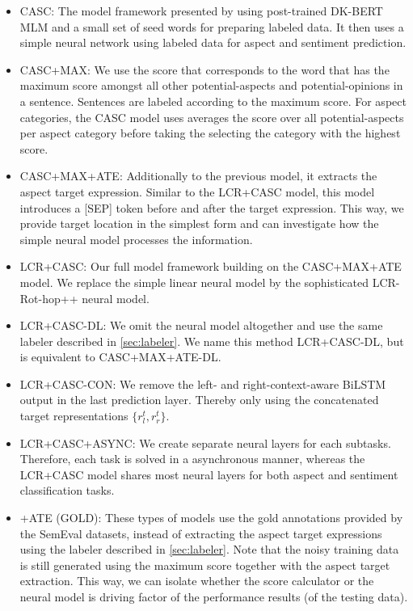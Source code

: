 \documentclass[american, oneside]{ecsgdp}
\begin{document}
\begin{itemize}
    \item CASC: The model framework presented by \textcite{Kumar2021CASC} using post-trained DK-BERT MLM and a small set of seed words for preparing labeled data. It then uses a simple neural network using labeled data for aspect and sentiment prediction.
    \item CASC+MAX: We use the score that corresponds to the word that has the maximum score amongst all other potential-aspects and potential-opinions in a sentence. Sentences are labeled according to the maximum score. For aspect categories, the CASC model uses averages the score over all potential-aspects per aspect category before taking the selecting the category with the highest score. 
    \item CASC+MAX+ATE: Additionally to the previous model, it extracts the aspect target expression. Similar to the LCR+CASC model, this model introduces a [SEP] token before and after the target expression. This way, we provide target location in the simplest form and can investigate how the simple neural model processes the information.
    \item LCR+CASC: Our full model framework building on the CASC+MAX+ATE model. We replace the simple linear neural model by the sophisticated LCR-Rot-hop++ neural model.
    \item LCR+CASC-DL: We omit the neural model altogether and use the same labeler described in \cref{sec:labeler}. We name this method LCR+CASC-DL, but is equivalent to CASC+MAX+ATE-DL.
    \item LCR+CASC-CON: We remove the left- and right-context-aware BiLSTM output in the last prediction layer. Thereby only using the concatenated target representations $\{r^t_l, r^t_r\}$.
    \item LCR+CASC+ASYNC: We create separate neural layers for each subtasks. Therefore, each task is solved in a asynchronous manner, whereas the LCR+CASC model shares most neural layers for both aspect and sentiment classification tasks.
    \item \-[MODEL]+ATE (GOLD): These types of models use the gold annotations provided by the SemEval datasets, instead of extracting the aspect target expressions using the labeler described in \cref{sec:labeler}. Note that the noisy training data is still generated using the maximum score together with the aspect target extraction. This way, we can isolate whether the score calculator or the neural model is driving factor of the performance results (of the testing data).
\end{itemize}
\end{document}
